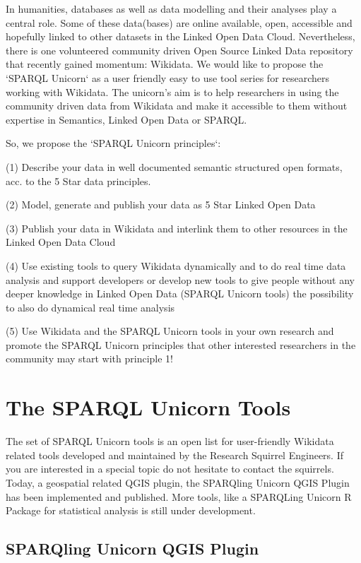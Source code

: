 \documentclass[twocolumn]{autart}
\begin{document}
In humanities, databases as well as data modelling and their analyses play a central role. Some of these data(bases) are online available, open, accessible and hopefully linked to other datasets in the Linked Open Data Cloud. Nevertheless, there is one volunteered community driven Open Source Linked Data repository that recently gained momentum: Wikidata. We would like to propose the `SPARQL Unicorn` as a user friendly easy to use tool series for researchers working with Wikidata. The unicorn’s aim is to help researchers in using the community driven data from Wikidata and make it accessible to them without expertise in Semantics, Linked Open Data or SPARQL.

So, we propose the `SPARQL Unicorn principles`:

(1) Describe your data in well documented semantic structured open formats, acc. to the 5 Star data principles.

(2) Model, generate and publish your data as 5 Star Linked Open Data

(3) Publish your data in Wikidata and interlink them to other resources in the Linked Open Data Cloud

(4) Use existing tools to query Wikidata dynamically and to do real time data analysis and support developers or develop new tools to give people without any deeper knowledge in Linked Open Data (SPARQL Unicorn tools) the possibility to also do dynamical real time analysis

(5) Use Wikidata and the SPARQL Unicorn tools in your own research and promote the SPARQL Unicorn principles that other interested researchers in the community may start with principle 1!

\section{The SPARQL Unicorn Tools}

The set of SPARQL Unicorn tools is an open list for user-friendly Wikidata related tools developed and maintained by the Research Squirrel Engineers. If you are interested in a special topic do not hesitate to contact the squirrels. Today, a geospatial related QGIS plugin, the SPARQling Unicorn QGIS Plugin has been implemented and published. More tools, like a SPARQLing Unicorn R Package for statistical analysis is still under development.

\subsection{SPARQling Unicorn QGIS Plugin}
\end{document}
